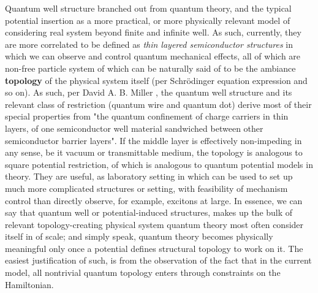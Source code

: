 \documentclass[%
 reprint,
 amsmath,amssymb,
 aps,
]{revtex4-2}
\begin{document}
Quantum well structure branched out from quantum theory, and the typical potential insertion as a more practical, or more physically relevant model of considering real system beyond finite and infinite well. As such, currently, they are more correlated to be defined as \textit{thin layered semiconductor structures} in which we can observe and control quantum mechanical effects, all of which are non-free particle system of which can be naturally said of to be the ambiance \textbf{topology} of the physical system itself (per Schrödinger equation expression and so on). As such, per David A. B. Miller \cite{David2020OpticalPO}, the quantum well structure and its relevant class of restriction (quantum wire and quantum dot) derive most of their special properties from "the quantum confinement of charge carriers in thin layers, of one semiconductor well material sandwiched between other semiconductor barrier layers". If the middle layer is effectively non-impeding in any sense, be it vacuum or transmittable medium, the topology is analogous to square potential restriction, of which is analogous to quantum potential models in theory. They are useful, as laboratory setting in which can be used to set up much more complicated structures or setting, with feasibility of mechanism control than directly observe, for example, excitons at large. In essence, we can say that quantum well or potential-induced structures, makes up the bulk of relevant topology-creating physical system quantum theory most often consider itself in of scale; and simply speak, quantum theory becomes physically meaningful only once a potential defines structural topology to work on it. The easiest justification of such, is from the observation of the fact that in the current model, all nontrivial quantum topology enters through constraints on the Hamiltonian.
\end{document}
